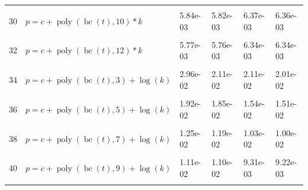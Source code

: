 \documentclass[12pt,a4paper]{article}
\DeclareMathOperator{\bc}{bc}
\DeclareMathOperator{\poly}{poly}
\begin{document}
\begin{longtable}[t]{ll>{\raggedleft\arraybackslash}p{2cm}>{\raggedleft\arraybackslash}p{2cm}>{\raggedleft\arraybackslash}p{2cm}>{\raggedleft\arraybackslash}p{2cm}}
\cellcolor{gray!6}{29} & \cellcolor{gray!6}{$p = c + \poly\left( \bc(t), 9 \right) * k$} & \cellcolor{gray!6}{6.31e-03} & \cellcolor{gray!6}{6.19e-03} & \cellcolor{gray!6}{6.81e-03} & \cellcolor{gray!6}{6.74e-03}\\
30 & $p = c + \poly\left( \bc(t), 10 \right) * k$ & 5.84e-03 & 5.82e-03 & 6.37e-03 & 6.36e-03\\
\cellcolor{gray!6}{31} & \cellcolor{gray!6}{$p = c + \poly\left( \bc(t), 11 \right) * k$} & \cellcolor{gray!6}{5.80e-03} & \cellcolor{gray!6}{5.78e-03} & \cellcolor{gray!6}{6.37e-03} & \cellcolor{gray!6}{6.36e-03}\\
32 & $p = c + \poly\left( \bc(t), 12 \right) * k$ & 5.77e-03 & 5.76e-03 & 6.34e-03 & 6.34e-03\\
\cellcolor{gray!6}{33} & \cellcolor{gray!6}{$p = c + \poly\left( \bc(t), 13 \right) * k$} & \cellcolor{gray!6}{5.74e-03} & \cellcolor{gray!6}{5.74e-03} & \cellcolor{gray!6}{6.32e-03} & \cellcolor{gray!6}{6.32e-03}\\
34 & $p = c + \poly\left( \bc(t), 3 \right) + \log(k)$ & 2.96e-02 & 2.11e-02 & 2.11e-02 & 2.01e-02\\
\cellcolor{gray!6}{35} & \cellcolor{gray!6}{$p = c + \poly\left( \bc(t), 4 \right) + \log(k)$} & \cellcolor{gray!6}{2.39e-02} & \cellcolor{gray!6}{2.22e-02} & \cellcolor{gray!6}{2.34e-02} & \cellcolor{gray!6}{2.24e-02}\\
36 & $p = c + \poly\left( \bc(t), 5 \right) + \log(k)$ & 1.92e-02 & 1.85e-02 & 1.54e-02 & 1.51e-02\\
\cellcolor{gray!6}{37} & \cellcolor{gray!6}{$p = c + \poly\left( \bc(t), 6 \right) + \log(k)$} & \cellcolor{gray!6}{1.30e-02} & \cellcolor{gray!6}{1.24e-02} & \cellcolor{gray!6}{1.16e-02} & \cellcolor{gray!6}{1.09e-02}\\
38 & $p = c + \poly\left( \bc(t), 7 \right) + \log(k)$ & 1.25e-02 & 1.19e-02 & 1.03e-02 & 1.00e-02\\
\cellcolor{gray!6}{39} & \cellcolor{gray!6}{$p = c + \poly\left( \bc(t), 8 \right) + \log(k)$} & \cellcolor{gray!6}{1.13e-02} & \cellcolor{gray!6}{1.11e-02} & \cellcolor{gray!6}{9.22e-03} & \cellcolor{gray!6}{9.19e-03}\\
40 & $p = c + \poly\left( \bc(t), 9 \right) + \log(k)$ & 1.11e-02 & 1.10e-02 & 9.31e-03 & 9.22e-03\\
\cellcolor{gray!6}{41} & \cellcolor{gray!6}{$p = c + \poly\left( \bc(t), 10 \right) + \log(k)$} & \cellcolor{gray!6}{1.08e-02} & \cellcolor{gray!6}{1.08e-02} & \cellcolor{gray!6}{8.94e-03} & \cellcolor{gray!6}{8.91e-03}\\

\end{longtable}
\end{document}
